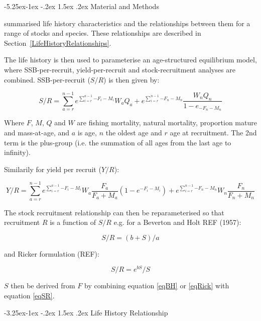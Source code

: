 \documentclass[a4paper, 10pt]{article}
\makeatletter
\renewcommand{\subsection}{\@startsection{subsection}{2}{\z@}%
 {-3.25ex\@plus -1ex \@minus -.2ex}%
 {1.5ex \@plus .2ex}%
 {\normalfont\bfseries\slshape}}
\renewcommand{\section}{\@startsection{section}{1}{\z@}%
 {-5.25ex\@plus -1ex \@minus -.2ex}%
 {1.5ex \@plus .2ex}%
 {\normalfont\bfseries}}
\makeatother
\begin{document}
\section{Material and Methods}

\citet{gislason2010does} summarised life history characteristics and the relationships
between them for a range of stocks and species. These relationships are described in
Section~\ref{LifeHistoryRelationships}.

The life history is then used to parameterise an age-structured equilibrium model, where SSB-per-recruit, yield-per-recruit
and stock-recruitment analyses are combined. SSB-per-recruit ($S/R$) is then given by:

\begin{equation}
S/R=\sum\limits_{a=r}^{n-1} {e^{\sum\limits_{i=r}^{a-1} {-F_i-M_i}}} W_a Q_a + e^{\sum\limits_{i=r}^{n-1} {-F_n-M_n}} \frac{W_n Q_n}{1-e_{-F_n-M_n}} \label{eqSR}
\end{equation} 

Where $F$, $M$, $Q$ and $W$ are fishing mortality, natural mortality, proportion mature
and mass-at-age, and $a$ is age, $n$ the oldest age and $r$ age at recruitment.
The 2nd term is the plus-group (i.e. the summation of all ages from the last age to infinity).

Similarily for yield per recruit ($Y/R$):

\begin{equation}
Y/R=\sum\limits_{a=r}^{n-1} {e^{\sum\limits_{i=r}^{a-1} {-F_i-M_i}}} W_a\frac{F_a}{F_a+M_a}\left(1-e^{-F_i-M_i} \right) + e^{\sum\limits_{i=r}^{n-1} {-F_n-M_n}} W_n\frac{F_n}{F_n+M_n} \label{eqYR}
\end{equation} 

The stock recruitment relationship can then be reparameterised so that recruitment $R$ is a function of $S/R$
e.g. for a Beverton and Holt REF (1957):

\begin{equation}
S/R=(b+S)/a \label{eqBH}
\end{equation} 

and Ricker formulation (REF):

\begin{equation}
S/R=e^{bS}/S \label{eqRick}
\end{equation} 

$S$ then be derived from $F$ by combining equation \ref{eqBH} or \ref{eqRick} with equation \ref{eqSR}.

\subsection{Life History Relationship}
\label{LifeHistoryRelationships}
\end{document}
